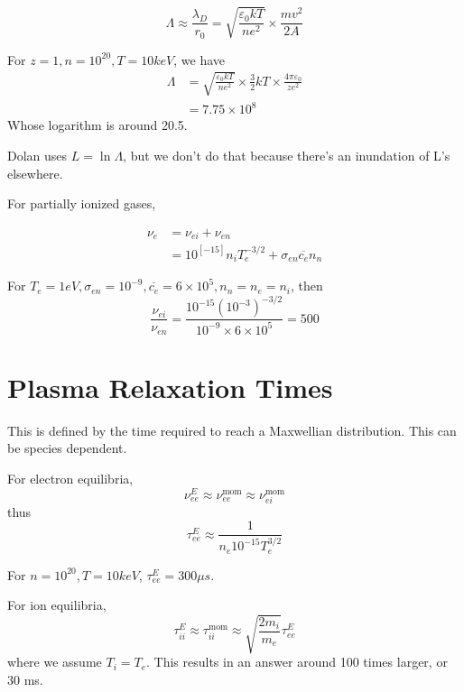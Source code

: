 \documentclass[12pt]{article}
\begin{document}
$$\Lambda \approx \frac{\lambda_D}{r_0} = \sqrt{\frac{\varepsilon_0kT}{ne^2}} \times \frac{mv^2}{2A}$$

\begin{ex}
    For $z=1,n=10^{20},T=10\unit{keV}$, we have
    \begin{align*}
        \Lambda &= \sqrt{\frac{\varepsilon_0kT}{ne^2}} \times \frac{3}{2}kT \times \frac{4\pi\varepsilon_0}{ze^2} \\
                &= 7.75 \times 10^8
    \end{align*}
    Whose logarithm is around 20.5.
\end{ex}

Dolan uses $L = \ln\Lambda$, but we don't do that because there's an inundation of L's elsewhere.

For partially ionized gases,

\begin{align*}
    \nu_e &= \nu_{ei} + \nu_{en} \\
          &= 10^[-15]n_iT_e^{-3/2} + \sigma_{en}\overline{c_e}n_n
\end{align*}

\begin{ex}
    For $T_e = 1\unit{eV}, \sigma_{en} = 10^{-9}, \overline{c_e} = 6 \times 10^5, n_n = n_e = n_i$, then
    $$\frac{\nu_{ei}}{\nu_{en}} = \frac{10^{-15}(10^{-3})^{-3/2}}{10^{-9} \times 6 \times 10^5} = 500$$
\end{ex}

\section{Plasma Relaxation Times}
    
\begin{defn}
    This is defined by the time required to reach a Maxwellian distribution. This can be species dependent.
\end{defn}

For electron equilibria,
$$\nu_{ee}^E \approx \nu_{ee}^{\text{mom}} \approx \nu_{ei}^{\text{mom}}$$
thus
$$\tau_{ee}^E \approx \frac{1}{n_e10^{-15}T_e^{3/2}}$$

\begin{ex}
    For $n=10^{20}, T = 10\unit{keV}$, $\tau_{ee}^E = 300\unit{\mu s}$.
\end{ex}

For ion equilibria,
$$\tau_{ii}^E \approx \tau_{ii}^{\text{mom}} \approx \sqrt{\frac{2m_i}{m_e}}\tau_{ee}^E$$
where we assume $T_i = T_e$. This results in an answer around 100 times larger, or 30 ms. \\
\end{document}
